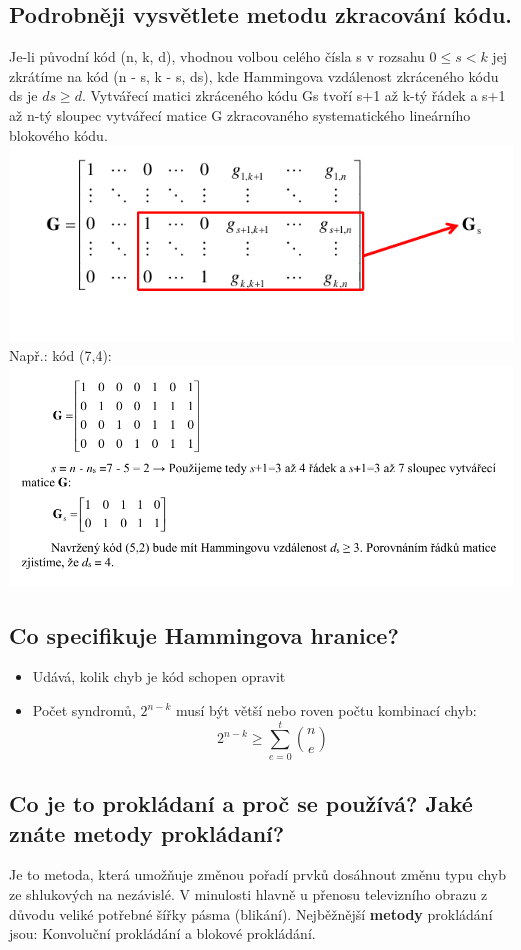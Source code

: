 \subsection{Podrobněji vysvětlete metodu zkracování kódu.}
Je-li původní kód (n, k, d), vhodnou volbou celého čísla s v rozsahu $0 \leq s < k$ jej
zkrátíme na kód (n - s, k - s, ds), kde Hammingova vzdálenost zkráceného kódu ds je $ds \geq d$.
Vytvářecí matici zkráceného kódu Gs tvoří s+1 až k-tý řádek a s+1 až n-tý sloupec vytvářecí
matice G zkracovaného systematického lineárního blokového kódu. \\
\includegraphics[width=16cm]{images/9_zkrac_obecne.png}\\
Např.: kód (7,4):\\
\includegraphics[width=16cm]{images/9_zkrac_priklad.png}

\subsection{Co specifikuje Hammingova hranice?}
\begin{itemize}
    \item Udává, kolik chyb je kód schopen opravit
    \item Počet syndromů, $2^{n-k}$ musí být větší nebo roven počtu kombinací chyb:
    $$2^{n-k}\geq \sum_{e=0}^t \binom{n}{e}$$
\end{itemize}

\subsection{Co je to prokládaní a proč se používá? Jaké znáte metody prokládaní?}
Je to metoda, která umožňuje změnou pořadí prvků dosáhnout změnu typu chyb ze shlukových na nezávislé. V minulosti hlavně u přenosu televizního obrazu z důvodu veliké potřebné šířky pásma (blikání). Nejběžnější \textbf{metody} prokládání jsou: Konvoluční prokládání a blokové prokládání.

